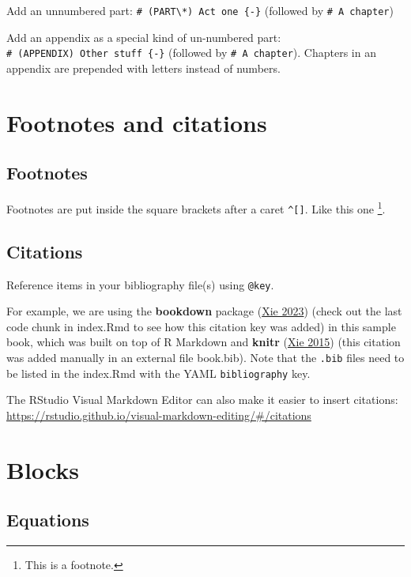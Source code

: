 \documentclass[
]{book}
\begin{document}
Add an unnumbered part:
\texttt{\#\ (PART\textbackslash{}*)\ Act\ one\ \{-\}} (followed by
\texttt{\#\ A\ chapter})

Add an appendix as a special kind of un-numbered part:
\texttt{\#\ (APPENDIX)\ Other\ stuff\ \{-\}} (followed by
\texttt{\#\ A\ chapter}). Chapters in an appendix are prepended with
letters instead of numbers.

\hypertarget{footnotes-and-citations}{%
\chapter{Footnotes and citations}\label{footnotes-and-citations}}

\hypertarget{footnotes}{%
\section{Footnotes}\label{footnotes}}

Footnotes are put inside the square brackets after a caret
\texttt{\^{}{[}{]}}. Like this one \footnote{This is a footnote.}.

\hypertarget{citations}{%
\section{Citations}\label{citations}}

Reference items in your bibliography file(s) using \texttt{@key}.

For example, we are using the \textbf{bookdown} package
(\protect\hyperlink{ref-R-bookdown}{Xie 2023}) (check out the last code
chunk in index.Rmd to see how this citation key was added) in this
sample book, which was built on top of R Markdown and \textbf{knitr}
(\protect\hyperlink{ref-xie2015}{Xie 2015}) (this citation was added
manually in an external file book.bib). Note that the \texttt{.bib}
files need to be listed in the index.Rmd with the YAML
\texttt{bibliography} key.

The RStudio Visual Markdown Editor can also make it easier to insert
citations:
\url{https://rstudio.github.io/visual-markdown-editing/\#/citations}

\hypertarget{blocks}{%
\chapter{Blocks}\label{blocks}}

\hypertarget{equations}{%
\section{Equations}\label{equations}}
\end{document}
